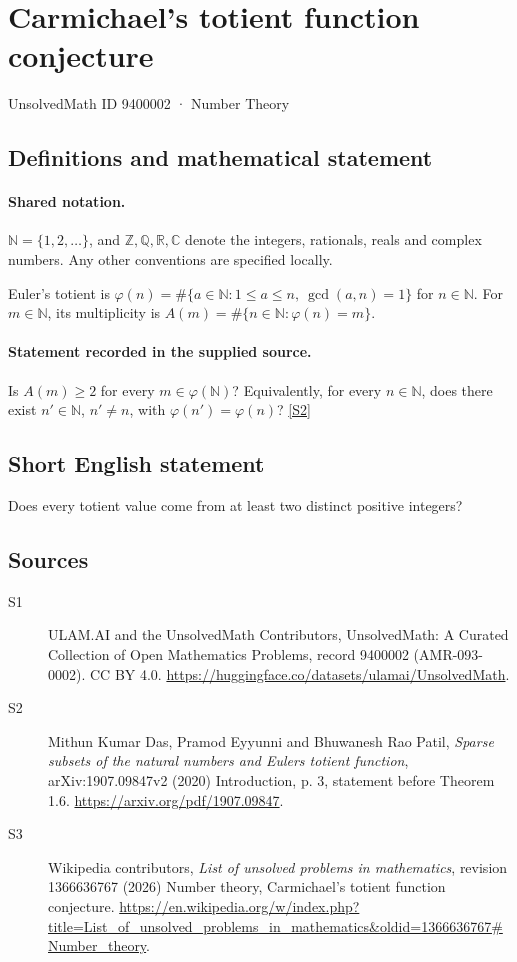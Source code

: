 \documentclass[11pt]{article}
\newcommand{\sref}[2]{\hyperlink{source:#1:#2}{[S#2]}}
\begin{document}
\setcounter{section}{9400001}
\section{Carmichael's totient function conjecture}\label{9400002}
{\small\sffamily UnsolvedMath ID 9400002 · Number Theory}
\subsection{Definitions and mathematical statement}

\paragraph{Shared notation.}$\mathbb N=\{1,2,\ldots\}$, and $\mathbb Z,\mathbb Q,\mathbb R,\mathbb C$ denote the integers, rationals, reals and complex numbers. Any other conventions are specified locally.


Euler's totient is $\varphi(n)=\#\{a\in\mathbb N:1\le a\le n,\ \gcd(a,n)=1\}$ for $n\in\mathbb N$. For $m\in\mathbb N$, its multiplicity is $A(m)=\#\{n\in\mathbb N:\varphi(n)=m\}$.
\paragraph{Statement recorded in the supplied source.}
Is $A(m)\ge2$ for every $m\in\varphi(\mathbb N)$? Equivalently, for every $n\in\mathbb N$, does there exist $n'\in\mathbb N$, $n'\ne n$, with $\varphi(n')=\varphi(n)$? \sref{9400002}{2}
\subsection{Short English statement}
Does every totient value come from at least two distinct positive integers?
\subsection{Sources}
\begin{description}
\item[\hypertarget{source:9400002:1}{S1}] ULAM.AI and the UnsolvedMath Contributors, UnsolvedMath: A Curated Collection of Open Mathematics Problems, record 9400002 (AMR-093-0002). CC BY 4.0. \url{https://huggingface.co/datasets/ulamai/UnsolvedMath}.
\item[\hypertarget{source:9400002:2}{S2}] Mithun Kumar Das, Pramod Eyyunni and Bhuwanesh Rao Patil, \emph{Sparse subsets of the natural numbers and Euler\textquotesingle s totient function}, arXiv:1907.09847v2 (2020) Introduction, p. 3, statement before Theorem 1.6. \url{https://arxiv.org/pdf/1907.09847}.
\item[\hypertarget{source:9400002:3}{S3}] Wikipedia contributors, \emph{List of unsolved problems in mathematics}, revision 1366636767 (2026) Number theory, Carmichael's totient function conjecture. \url{https://en.wikipedia.org/w/index.php?title=List_of_unsolved_problems_in_mathematics&oldid=1366636767#Number_theory}.
\end{description}
\label{end:9400002}
\end{document}
